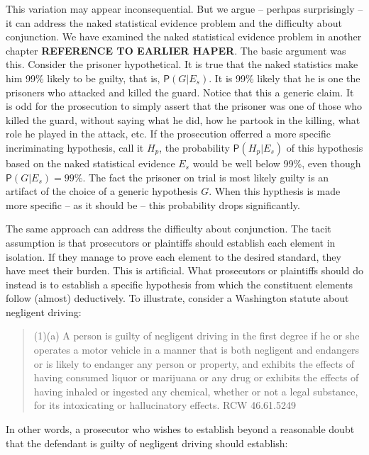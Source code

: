 \documentclass[10pt,dvipsnames,enabledeprecatedfontcommands]{scrartcl}
\newcommand{\pr}[1]{\mathsf{P}(#1)}
\begin{document}
This variation may appear inconsequential. But we argue -- perhpas
surprisingly -- it can address the naked statistical evidence problem
and the difficulty about conjunction. We have examined the naked
statistical evidence problem in another chapter
\textbf{REFERENCE TO EARLIER HAPER}. The basic argument was this.
Consider the prisoner hypothetical. It is true that the naked statistics
make him 99\% likely to be guilty, that is, \(\pr{G | E_s}\). It is 99\%
likely that he is one the prisoners who attacked and killed the guard.
Notice that this a generic claim. It is odd for the prosecution to
simply assert that the prisoner was one of those who killed the guard,
without saying what he did, how he partook in the killing, what role he
played in the attack, etc. If the prosecution offerred a more specific
incriminating hypothesis, call it \(H_p\), the probability
\(\pr{H_p | E_{s}}\) of this hypothesis based on the naked statistical
evidence \(E_s\) would be well below 99\%, even though
\(\pr{G | E_s}=99\%\). The fact the prisoner on trial is most likely
guilty is an artifact of the choice of a generic hypothesis \(G\). When
this hypthesis is made more specific -- as it should be -- this
probability drops significantly.

The same approach can address the difficulty about conjunction. The
tacit assumption is that prosecutors or plaintiffs should establish each
element in isolation. If they manage to prove each element to the
desired standard, they have meet their burden. This is artificial. What
prosecutors or plaintiffs should do instead is to establish a specific
hypothesis from which the constituent elements follow (almost)
deductively. To illustrate, consider a Washington statute about
negligent driving:

\begin{quote}
(1)(a) A person is guilty of negligent driving in the first degree if he or she operates a motor vehicle in a manner that is both negligent and endangers or is likely to endanger any person or property, and exhibits the effects of having consumed liquor or marijuana or any drug or exhibits the effects of having inhaled or ingested any chemical, whether or not a legal substance, for its intoxicating or hallucinatory effects. RCW 46.61.5249
\end{quote}

\noindent In other words, a prosecutor who wishes to establish beyond a
reasonable doubt that the defendant is guilty of negligent driving
should establish:
\end{document}
